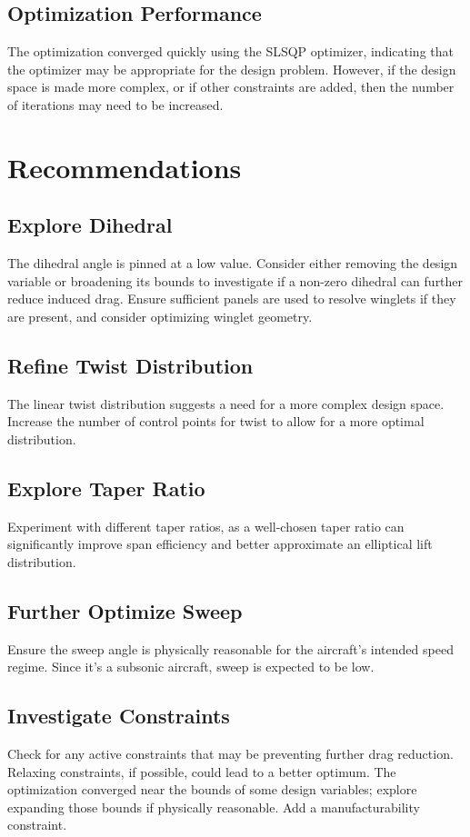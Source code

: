 \documentclass{article}
\begin{document}
\subsection{Optimization Performance}
The optimization converged quickly using the SLSQP optimizer, indicating that the optimizer may be appropriate for the design problem. However, if the design space is made more complex, or if other constraints are added, then the number of iterations may need to be increased.

\section{Recommendations}

\subsection{Explore Dihedral}
The dihedral angle is pinned at a low value. Consider either removing the design variable or broadening its bounds to investigate if a non-zero dihedral can further reduce induced drag. Ensure sufficient panels are used to resolve winglets if they are present, and consider optimizing winglet geometry.

\subsection{Refine Twist Distribution}
The linear twist distribution suggests a need for a more complex design space. Increase the number of control points for twist to allow for a more optimal distribution.

\subsection{Explore Taper Ratio}
Experiment with different taper ratios, as a well-chosen taper ratio can significantly improve span efficiency and better approximate an elliptical lift distribution.

\subsection{Further Optimize Sweep}
Ensure the sweep angle is physically reasonable for the aircraft's intended speed regime. Since it's a subsonic aircraft, sweep is expected to be low.

\subsection{Investigate Constraints}
Check for any active constraints that may be preventing further drag reduction. Relaxing constraints, if possible, could lead to a better optimum. The optimization converged near the bounds of some design variables; explore expanding those bounds if physically reasonable. Add a manufacturability constraint.
\end{document}

